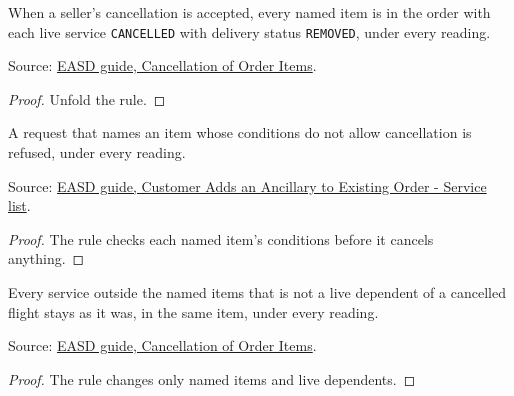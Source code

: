 \begin{theorem}
  \label{thm:ancillaries-cancel-named}
  When a seller's cancellation is accepted, every named item is in the
  order with each live service \texttt{CANCELLED} with delivery status
  \texttt{REMOVED}, under every reading.

  Source: \href{https://standards.atlassian.net/wiki/spaces/EASD/pages/574783569}{EASD guide, Cancellation of Order Items}.
\end{theorem}
\begin{proof}
  Unfold the rule.
\end{proof}

\begin{theorem}
  \label{thm:ancillaries-cancel-refuses-not-cancellable}
  A request that names an item whose conditions do not allow cancellation
  is refused, under every reading.

  Source: \href{https://standards.atlassian.net/wiki/spaces/EASD/pages/842301531}{EASD guide, Customer Adds an Ancillary to Existing Order - Service list}.
\end{theorem}
\begin{proof}
  The rule checks each named item's conditions before it cancels
  anything.
\end{proof}

\begin{theorem}
  \label{thm:ancillaries-cancel-keeps-others}
  Every service outside the named items that is not a live dependent of a
  cancelled flight stays as it was, in the same item, under every reading.

  Source: \href{https://standards.atlassian.net/wiki/spaces/EASD/pages/574783569}{EASD guide, Cancellation of Order Items}.
\end{theorem}
\begin{proof}
  The rule changes only named items and live dependents.
\end{proof}

